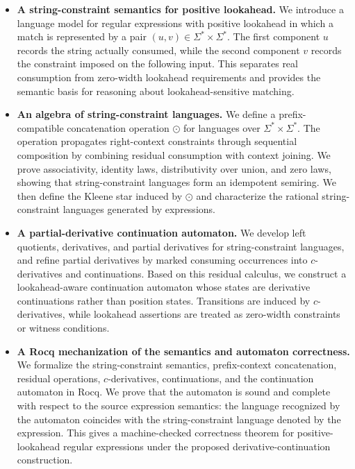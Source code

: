 \begin{itemize}

\item
\textbf{A string-constraint semantics for positive lookahead.}
We introduce a language model for regular expressions with positive
lookahead in which a match is represented by a pair
$(u,v)\in\Sigma^*\times\Sigma^*$. The first component $u$ records the
string actually consumed, while the second component $v$ records the
constraint imposed on the following input. This separates real
consumption from zero-width lookahead requirements and provides the
semantic basis for reasoning about lookahead-sensitive matching.

\item
\textbf{An algebra of string-constraint languages.}
We define a prefix-compatible concatenation operation $\odot$ for
languages over $\Sigma^*\times\Sigma^*$. The operation propagates
right-context constraints through sequential composition by combining
residual consumption with context joining. We prove associativity,
identity laws, distributivity over union, and zero laws, showing that
string-constraint languages form an idempotent semiring. We then define
the Kleene star induced by $\odot$ and characterize the rational
string-constraint languages generated by expressions.

\item
\textbf{A partial-derivative continuation automaton.}
We develop left quotients, derivatives, and partial derivatives for
string-constraint languages, and refine partial derivatives by marked
consuming occurrences into $c$-derivatives and continuations. Based on
this residual calculus, we construct a lookahead-aware continuation
automaton whose states are derivative continuations rather than
position states. Transitions are induced by $c$-derivatives, while
lookahead assertions are treated as zero-width constraints or witness
conditions.

\item
\textbf{A Rocq mechanization of the semantics and automaton correctness.}
We formalize the string-constraint semantics, prefix-context
concatenation, residual operations, $c$-derivatives, continuations, and
the continuation automaton in Rocq. We prove that the automaton is sound
and complete with respect to the source expression semantics: the
language recognized by the automaton coincides with the
string-constraint language denoted by the expression. This gives a
machine-checked correctness theorem for positive-lookahead regular
expressions under the proposed derivative-continuation construction.

\end{itemize}


